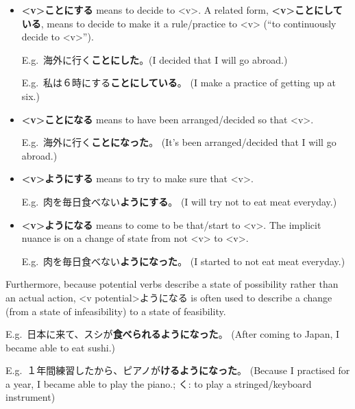 \documentclass[../nihongo-gakushuu-kyouzai-grammar.tex]{subfiles}
\begin{document}

\begin{itemize}
    \item \textbf{<v>ことにする} means to decide to <v>. A related form, \textbf{<v>ことにしている}, means to decide to make it a rule/practice to <v> (``to continuously decide to <v>'').

    E.g.\ 海外に行く\textbf{ことにした}。(I decided that I will go abroad.)

    E.g.\ 私は６時にする\textbf{ことにしている}。 (I make a practice of getting up at six.)

    \item \textbf{<v>ことになる} means to have been arranged/decided so that <v>.

    E.g.\ 海外に行く\textbf{ことになった}。 (It's been arranged/decided that I will go abroad.)
    \item \textbf{<v>ようにする} means to try to make sure that <v>.

    E.g.\ 肉を毎日食べない\textbf{ようにする}。 (I will try not to eat meat everyday.)

    \item \textbf{<v>ようになる} means to come to be that/start to <v>. The implicit nuance is on a change of state from not <v> to <v>.

    E.g.\ 肉を毎日食べない\textbf{ようになった}。 (I started to not eat meat everyday.)
\end{itemize}

Furthermore, because potential verbs describe a state of possibility rather than an actual action, <v potential>ようになる is often used to describe a change (from a state of infeasibility) to a state of feasibility.

E.g.\ 日本に来て、スシが\textbf{食べられるようになった}。 (After coming to Japan, I became able to eat sushi.)

E.g.\ １年間練習したから、ピアノが\textbf{けるようになった}。 (Because I practised for a year, I became able to play the piano.; く: to play a stringed/keyboard instrument)
\end{document}
